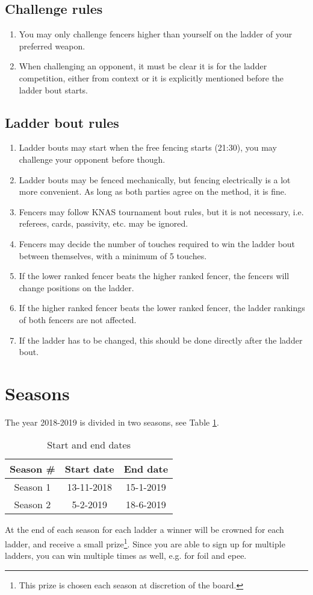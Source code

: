 \documentclass{article}
\begin{document}
\subsection{Challenge rules}
\begin{enumerate}
    \item You may only challenge fencers higher than yourself on the ladder of your preferred weapon.
    \item When challenging an opponent, it must be clear it is for the ladder competition, either from context or it is explicitly mentioned before the ladder bout starts.
\end{enumerate}
\subsection{Ladder bout rules}
\begin{enumerate}
    \item Ladder bouts may start when the free fencing starts (21:30), you may challenge your opponent before though.
    \item Ladder bouts may be fenced mechanically, but fencing electrically is a lot more convenient. As long as both parties agree on the method, it is fine.
    \item Fencers may follow KNAS tournament bout rules, but it is not necessary, i.e. referees, cards, passivity, etc. may be ignored.
    \item Fencers may decide the number of touches required to win the ladder bout between themselves, with a minimum of 5 touches.
    \item If the lower ranked fencer beats the higher ranked fencer, the fencers will change positions on the ladder.
    \item If the higher ranked fencer beats the lower ranked fencer, the ladder rankings of both fencers are not affected.
    \item If the ladder has to be changed, this should be done directly after the ladder bout.
\end{enumerate}
\section{Seasons} \label{sec:Seasons}
The year 2018-2019 is divided in two seasons, see Table \ref{tab:dates}.
\begin{table}[ht]
    \centering
    \begin{tabular}{|c|c|c|}
        \hline
        Season \# & Start date & End date \\ \hline
        Season 1 & 13-11-2018 & 15-1-2019 \\ \hline
        Season 2 & 5-2-2019 & 18-6-2019 \\ \hline
    \end{tabular}
    \caption{Start and end dates}
    \label{tab:dates}
\end{table}
At the end of each season for each ladder a winner will be crowned for each ladder, and receive a small prize\footnote{This prize is chosen each season at discretion of the board.}. Since you are able to sign up for multiple ladders, you can win multiple times as well, e.g. for foil and epee.
\end{document}
